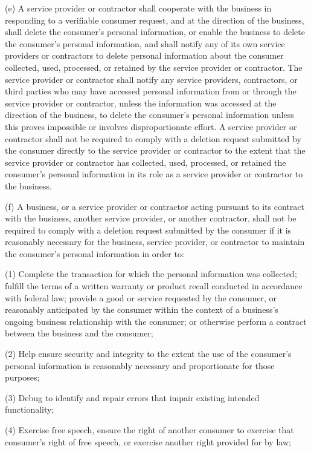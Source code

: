      (e)  A service provider or contractor shall cooperate with the business in responding to a verifiable consumer request, and at the direction of the business, shall delete the consumer's personal information, or enable the business to delete the consumer's personal information, and shall notify any of its own service providers or contractors to delete personal information about the consumer collected, used, processed, or retained by the service provider or contractor.  The service provider or contractor shall notify any service providers, contractors, or third parties who may have accessed personal information from or through the service provider or contractor, unless the information was accessed at the direction of the business, to delete the consumer's personal information unless this proves impossible or involves disproportionate effort.  A service provider or contractor shall not be required to comply with a deletion request submitted by the consumer directly to the service provider or contractor to the extent that the service provider or contractor has collected, used, processed, or retained the consumer's personal information in its role as a service provider or contractor to the business.

     (f)  A business, or a service provider or contractor acting pursuant to its contract with the business, another service provider, or another contractor, shall not be required to comply with a deletion request submitted by the consumer if it is reasonably necessary for the business, service provider, or contractor to maintain the consumer's personal information in order to:

     (1)  Complete the transaction for which the personal information was collected; fulfill the terms of a written warranty or product recall conducted in accordance with federal law; provide a good or service requested by the consumer, or reasonably anticipated by the consumer within the context of a business's ongoing business relationship with the consumer; or otherwise perform a contract between the business and the consumer;

     (2)  Help ensure security and integrity to the extent the use of the consumer's personal information is reasonably necessary and proportionate for those purposes;

     (3)  Debug to identify and repair errors that impair existing intended functionality;

     (4)  Exercise free speech, ensure the right of another consumer to exercise that consumer's right of free speech, or exercise another right provided for by law;

